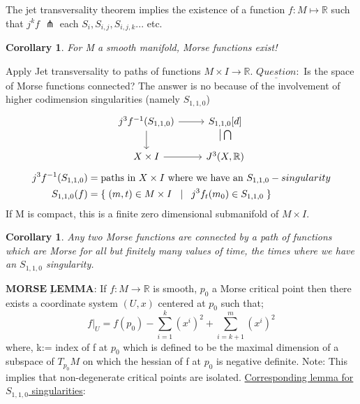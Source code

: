 \documentclass{article}
\newtheorem{corollary}[theorem]{Corollary}
\newtheorem{proposed work}[theorem]{Proposed Work}
\begin{document}
The jet transversality theorem implies the existence of a function $f:M\mapsto \mathbb{R}$ such that $j^{k}f$ $\pitchfork$ each $S_i,S_{i,j},S_{i,j,k}...$ etc.
\begin{corollary}
For M a smooth manifold, Morse functions exist! 
\end{corollary} 
Apply Jet transversality to paths of functions $M\times I\to \mathbb{R}.$
\newline
$\underline{Question}:$
Is the space of Morse functions connected?
The answer is no because of the involvement of higher codimension singularities (namely $S_{1,1,0}$)
\newline
\newline
\begin{equation*}
\begin{tikzcd}
j^3f^{-1}(S_{1,1,0}) \arrow[r] \arrow[d] \arrow[dr, phantom, , very near start]
& S_{1,1,0}   
 [d] \arrow[d, phantom,"\big| \bigcap" , near start] \\
X\times I \arrow[r]
& J^3(X,\mathbb{R})
\end{tikzcd}
\end{equation*}
\newline
\newline
\begin{align*}
j^3f^{-1}(S_{1,1,0})&=\text{paths in $X\times I$ where we have an $S_{1,1,0}-singularity$}\\ 
S_{1,1,0}(f)&=\{\hspace{1mm}(m,t)\in M\times I \hspace{3mm}|\hspace{3mm} j^3f_t(m_0)\in S_{1,1,0}\hspace{1mm}\}
\end{align*}
\newline
\newline
If M is compact, this is a finite zero dimensional submanifold of $M\times I$.

\begin{corollary}
Any two Morse functions are connected by a path of functions which are Morse for all but finitely many values of time, the times where we have an $S_{1,1,0}$ singularity.
\end{corollary}
$\underline{\textbf{MORSE LEMMA:}}$
If $f\colon M \to \mathbb{R}$ is smooth, $p_0$ a Morse critical point then there exists a coordinate system $(U,x)$ centered at $p_0$ such that;
$$f|_{U}=f(p_0)-\sum_{i=1}^{k}(x^i)^2+\sum_{i=k+1}^{m}(x^i)^2$$
where, k:= index of f at $p_0$ which is defined to be the maximal dimension of a subspace of $T_{p_0}M$ on which the hessian of f at $p_0$ is negative definite. 
\newline
Note: This implies that non-degenerate critical points are isolated. 
\newline
\newline
\underline{Corresponding lemma for $S_{1,1,0}$ singularities}:
\end{document}
